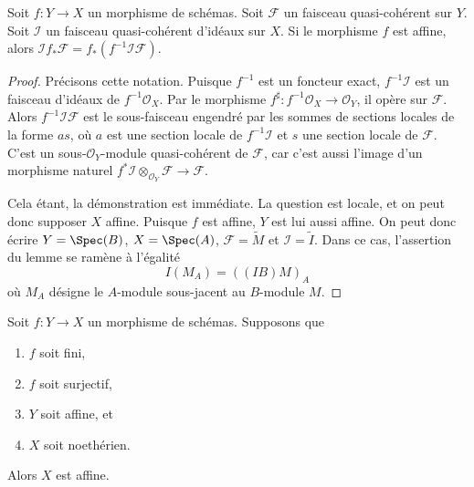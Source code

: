 \begin{lemma}
\label{lemma-affine-morphism-projection-ideal}
Soit $f : Y \to X$ un morphisme de schémas.
Soit $\mathcal{F}$ un faisceau quasi-cohérent sur $Y$.
Soit $\mathcal{I}$ un faisceau quasi-cohérent d'idéaux sur $X$.
Si le morphisme $f$ est affine, alors
$\mathcal{I}f_*\mathcal{F} = f_*(f^{-1}\mathcal{I}\mathcal{F})$.
\end{lemma}

\begin{proof}
Précisons cette notation. Puisque $f^{-1}$ est un foncteur exact,
$f^{-1}\mathcal{I}$ est un faisceau
d'idéaux de $f^{-1}\mathcal{O}_X$. Par le morphisme
$f^\sharp : f^{-1}\mathcal{O}_X \to \mathcal{O}_Y$, il opère sur
$\mathcal{F}$. Alors $f^{-1}\mathcal{I}\mathcal{F}$ est le sous-faisceau
engendré par les sommes de sections locales de la forme $as$, où $a$
est une section locale de $f^{-1}\mathcal{I}$ et $s$ une section locale
de $\mathcal{F}$. C'est un sous-$\mathcal{O}_Y$-module quasi-cohérent
de $\mathcal{F}$, car c'est aussi l'image d'un morphisme naturel
$f^*\mathcal{I} \otimes_{\mathcal{O}_Y} \mathcal{F} \to \mathcal{F}$.

\medskip\noindent
Cela étant, la démonstration est immédiate. La question est locale,
et on peut donc supposer $X$ affine. Puisque $f$ est affine,
$Y$ est lui aussi affine. On peut donc écrire
$Y = \Spec(B)$, $X = \Spec(A)$, $\mathcal{F} = \widetilde{M}$
et $\mathcal{I} = \widetilde{I}$. Dans ce cas, l'assertion du lemme
se ramène à l'égalité
$$
I(M_A) = ((IB)M)_A
$$
où $M_A$ désigne le $A$-module sous-jacent au $B$-module $M$.
\end{proof}

\begin{lemma}
\label{lemma-image-affine-finite-morphism-affine-Noetherian}
Soit $f : Y \to X$ un morphisme de schémas.
Supposons que
\begin{enumerate}
\item $f$ soit fini,
\item $f$ soit surjectif,
\item $Y$ soit affine, et
\item $X$ soit noethérien.
\end{enumerate}
Alors $X$ est affine.
\end{lemma}

